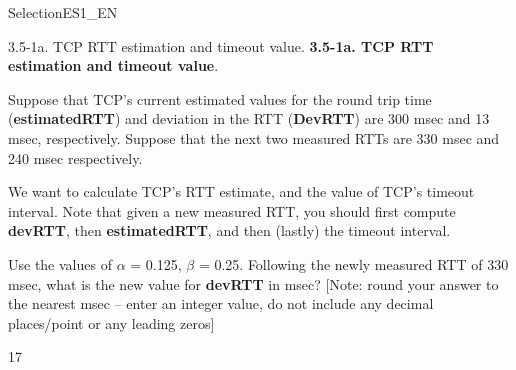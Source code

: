 \documentclass[a4paper]{article}
\begin{document}
\begin{quiz}{SelectionES1\_EN}
\begin{shortanswer}[points=1,shuffle]{3.5-1a. TCP RTT estimation and timeout value.}
\textbf{3.5-1a. TCP RTT estimation and timeout value}. 

Suppose that TCP's current estimated values for the round trip time (\textbf{estimatedRTT}) and deviation in the RTT (\textbf{DevRTT}) are 300 msec and 13 msec, respectively. Suppose that the next two measured RTTs are 330 msec and 240 msec respectively. 

We want to calculate TCP's RTT estimate, and the value of TCP's timeout interval. Note that given a new measured RTT, you should first compute \textbf{devRTT}, then \textbf{estimatedRTT}, and then (lastly) the timeout interval. 

Use the values of $\alpha$ = 0.125, $\beta$ = 0.25. Following the newly measured RTT of 330 msec, what is the new value for \textbf{devRTT} in msec? [Note: round your answer to the nearest msec -- enter an integer value, do not include any decimal places/point or any leading zeros]
\item* 17
\end{shortanswer}

\end{quiz}
\end{document}
